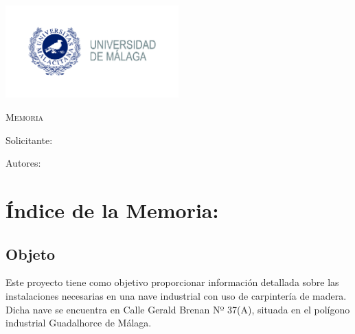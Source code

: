 \documentclass[../main.tex]{subfiles}
\begin{document}
\newpage
\thispagestyle{empty}
\begin{center}
    {\includegraphics[width=0.5\textwidth]{Imagenes/Logo UMA.jpg}\par}
    \vspace{1cm}
    {\bfseries\LARGE \Facultad \par}
    \vspace{0.5cm}
    {\scshape\Large \Grado \par}
    \vspace{3cm}
    {\scshape\Huge Memoria \par}
    \vspace{1.5cm}
    {\itshape\Large \TituloProyecto \par}
    \vfill
    {\Large Solicitante: \par}
    {\Large \Solicitante  \par}
    \vspace{1cm}
    {\Large Autores: \par}
    {\Large \Autora \par}
    {\Large \Autor \par}
    \vfill
    {\Large \Fecha \par}
\end{center}

\chapter*{Índice de la Memoria:}
\newpage
{}

\section{Objeto}
Este proyecto tiene como objetivo proporcionar información detallada sobre las instalaciones necesarias en una nave industrial con uso de carpintería de madera. Dicha nave se encuentra en Calle Gerald Brenan Nº 37(A), situada en el polígono industrial Guadalhorce de Málaga.
\end{document}
